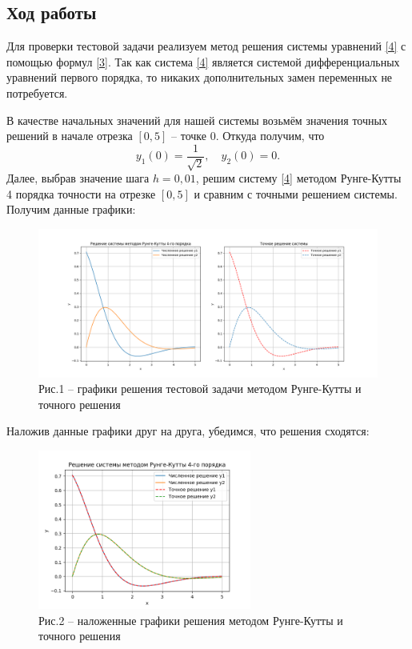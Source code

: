 \documentclass[a4paper,12pt]{article}
\begin{document}
{\newpage
\begin{center}
	\section*{Ход работы}
\end{center}
\par Для проверки тестовой задачи реализуем метод решения системы уравнений \eqref{4} с помощью формул \eqref{3}.
Так как система \eqref{4} является системой дифференциальных уравнений первого порядка, то никаких дополнительных замен переменных не потребуется.

В качестве начальных значений для нашей системы возьмём значения точных решений в начале отрезка $[0, 5]$ -- точке $0$. Откуда получим, что
\begin{equation*}
	y_1(0) = \frac{1}{\sqrt{2}}, \quad y_2(0) = 0.
\end{equation*}
Далее, выбрав значение шага $h = 0,01$, решим систему \eqref{4} методом Рунге-Кутты 4 порядка точности на отрезке $[0, 5]$ и сравним с точными решением системы. Получим данные графики:
\begin{figure}[ht]
	\includegraphics[width=\textwidth]{plot_test_task_exact_and_method.png}
	\caption*{{\small Рис.1 -- графики решения тестовой задачи методом Рунге-Кутты и точного решения}}
\end{figure}

Наложив данные графики друг на друга, убедимся, что решения сходятся:
\begin{figure}[ht]
	\centering
	\includegraphics[width=7cm]{plot_test_task.png}
	\caption*{{\small Рис.2 -- наложенные графики решения методом Рунге-Кутты и точного решения}}
\end{figure}

}
\end{document}

